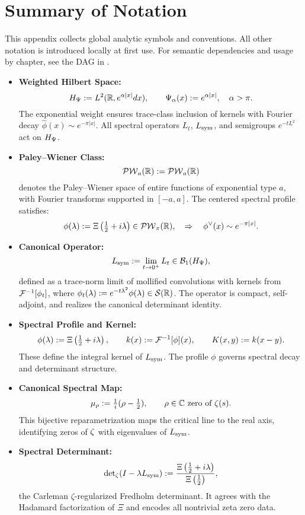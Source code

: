 \section{Summary of Notation}
\label{app:notation_summary}

\noindent
This appendix collects global analytic symbols and conventions. All other notation is introduced locally at first use. For semantic dependencies and usage by chapter, see the DAG in .

\begin{itemize}
  \item \textbf{Weighted Hilbert Space:}
  \[
  H_{\Psi} := L^2(\mathbb{R}, e^{\alpha |x|} dx), \qquad \Psi_\alpha(x) := e^{\alpha |x|}, \quad \alpha > \pi.
  \]
  The exponential weight ensures trace-class inclusion of kernels with Fourier decay \( \widehat{\phi}(x) \sim e^{-\pi |x|} \). All spectral operators \( L_t \), \( L_{\mathrm{sym}} \), and semigroups \( e^{-tL^2} \) act on \( H_{\Psi} \).

  \item \textbf{Paley–Wiener Class:}
  \[
  \mathcal{PW}_{a}(\mathbb{R}) := \mathcal{PW}_a(\mathbb{R})
  \]
  denotes the Paley–Wiener space of entire functions of exponential type \( a \), with Fourier transforms supported in \( [-a, a] \). The centered spectral profile satisfies:
  \[
  \phi(\lambda) := \Xi\left( \tfrac{1}{2} + i\lambda \right) \in \mathcal{PW}_{\pi}(\mathbb{R}), \quad \Rightarrow \quad \phi^\vee(x) \sim e^{-\pi |x|}.
  \]

  \item \textbf{Canonical Operator:}
  \[
  L_{\mathrm{sym}} := \lim_{t \to 0^+} L_t \in \mathcal{B}_1(H_{\Psi}),
  \]
  defined as a trace-norm limit of mollified convolutions with kernels from \( \mathcal{F}^{-1}[\phi_t] \), where \( \phi_t(\lambda) := e^{-t\lambda^2} \phi(\lambda) \in \mathcal{S}(\mathbb{R}) \). The operator is compact, self-adjoint, and realizes the canonical determinant identity.

  \item \textbf{Spectral Profile and Kernel:}
  \[
  \phi(\lambda) := \Xi\left( \tfrac{1}{2} + i\lambda \right), \qquad k(x) := \mathcal{F}^{-1}[\phi](x), \qquad K(x, y) := k(x - y).
  \]
  These define the integral kernel of \( L_{\mathrm{sym}} \). The profile \( \phi \) governs spectral decay and determinant structure.

  \item \textbf{Canonical Spectral Map:}
  \[
  \mu_\rho := \tfrac{1}{i}(\rho - \tfrac{1}{2}), \qquad \rho \in \mathbb{C} \text{ zero of } \zeta(s).
  \]
  This bijective reparametrization maps the critical line to the real axis, identifying zeros of \( \zeta \) with eigenvalues of \( L_{\mathrm{sym}} \).

  \item \textbf{Spectral Determinant:}
  \[
  \det\nolimits_\zeta(I - \lambda L_{\mathrm{sym}}) := \frac{\Xi\left( \tfrac{1}{2} + i\lambda \right)}{\Xi\left( \tfrac{1}{2} \right)},
  \]
  the Carleman \(\zeta\)-regularized Fredholm determinant. It agrees with the Hadamard factorization of \( \Xi \) and encodes all nontrivial zeta zero data.
\end{itemize}

